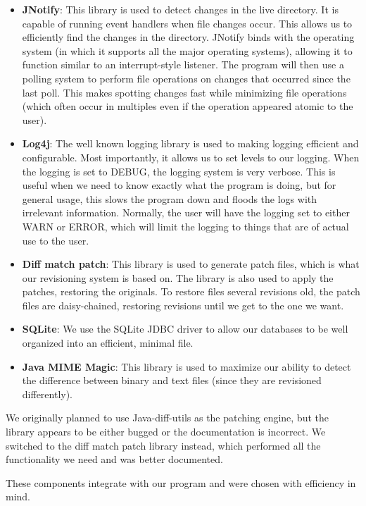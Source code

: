 \documentclass[12pt,a4paper]{article}
\begin{document}
\begin{itemize}
\item \textbf{JNotify}: This library is used to detect changes in the live directory. It is capable of running event handlers when file changes occur. This allows us to efficiently find the changes in the directory. JNotify binds with the operating system (in which it supports all the major operating systems), allowing it to function similar to an interrupt-style listener. The program will then use a polling system to perform file operations on changes that occurred since the last poll. This makes spotting changes fast while minimizing file operations (which often occur in multiples even if the operation appeared atomic to the user).
\item \textbf{Log4j}: The well known logging library is used to making logging efficient and configurable. Most importantly, it allows us to set levels to our logging. When the logging is set to DEBUG, the logging system is very verbose. This is useful when we need to know exactly what the program is doing, but for general usage, this slows the program down and floods the logs with irrelevant information. Normally, the user will have the logging set to either WARN or ERROR, which will limit the logging to things that are of actual use to the user.
\item \textbf{Diff match patch}: This library is used to generate patch files, which is what our revisioning system is based on. The library is also used to apply the patches, restoring the originals. To restore files several revisions old, the patch files are daisy-chained, restoring revisions until we get to the one we want.
\item \textbf{SQLite}: We use the SQLite JDBC driver to allow our databases to be well organized into an efficient, minimal file.
\item \textbf{Java MIME Magic}: This library is used to maximize our ability to detect the difference between binary and text files (since they are revisioned differently).
\end{itemize}

We originally planned to use Java-diff-utils as the patching engine, but the library appears to be either bugged or the documentation is incorrect. We switched to the diff match patch library instead, which performed all the functionality we need and was better documented.

These components integrate with our program and were chosen with efficiency in mind.
\end{document}
